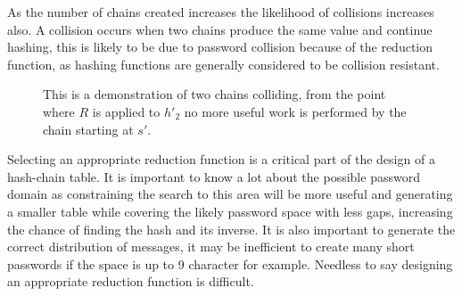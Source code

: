 \documentclass[a4paper,12pt]{article}
\begin{document}
As the number of chains created increases the likelihood of collisions increases also. A collision occurs when two chains produce the same value and continue hashing, this is likely to be due to password collision because of the reduction function, as hashing functions are generally considered to be collision resistant.
\begin{figure}
    \begin{center}
\end{center}
\caption{This is a demonstration of two chains colliding, from the point where $R$ is applied to $h'_2$ no more useful work is performed by the chain starting at $s'$.}
\label{fig:col}
\end{figure}

Selecting an appropriate reduction function is a critical part of the design of a hash-chain table. It is important to know a lot about the possible password domain as constraining the search to this area will be more useful and generating a smaller table while covering the likely password space with less gaps, increasing the chance of finding the hash and its inverse. It is also important to generate the correct distribution of messages, it may be inefficient to create many short passwords if the space is up to 9 character for example. Needless to say designing an appropriate reduction function is difficult.
\end{document}
